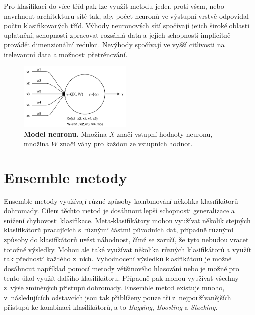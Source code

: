 Pro klasifikaci do více tříd pak lze využít metodu jeden proti všem, nebo navrhnout architekturu sítě tak, aby počet neuronů ve výstupní vrstvě odpovídal počtu klasifikovaných tříd. Výhody neuronových sítí spočívají jejich široké oblasti uplatnění, schopnosti zpracovat rozsáhlá data a jejich schopnosti implicitně provádět dimenzionální redukci. Nevýhody spočívají ve vyšší citlivosti na irelevantní data a možnosti přetrénování.\cite{data_classification}\cite{machine_learning}

\begin{figure}[h]
    \centering
    \includegraphics[width=0.49\textwidth]{obrazky/neuron.pdf}
    \caption{\textbf{Model neuronu.} Množina $X$ značí vstupní hodnoty neuronu, množina $W$ značí váhy pro každou ze vstupních hodnot.}
    \label{obr_neuron}
\end{figure}

\section{Ensemble metody}
\label{ensemble_metody}
Ensemble metody využívají různé způsoby kombinování několika klasifikátorů dohromady. Cílem těchto metod je dosáhnout lepší schopnosti generalizace a snížení chybovosti klasifikace. Meta-klasifikátory mohou využívat několik stejných klasifikátorů pracujících s~různými částmi původních dat, případně různými způsoby do klasifikátorů uvést náhodnost, čímž se zaručí, že tyto nebudou vracet totožné výsledky. Mohou ale také využívat několika různých klasifikátorů a využít tak předností každého z~nich. Vyhodnocení výsledků klasifikátorů je možné dosáhnout například pomocí metody většinového hlasování nebo je možné pro tento úkol využít dalšího klasifikátoru. Případně pak mohou využívat všechny z~výše zmíněných přístupů dohromady. Ensemble metod existuje mnoho, v~následujících odstavcích jsou tak přiblíženy pouze tři z~nejpoužívanějších přístupů ke kombinaci klasifikátorů, a to \textit{Bagging}, \textit{Boosting} a \textit{Stacking}.

